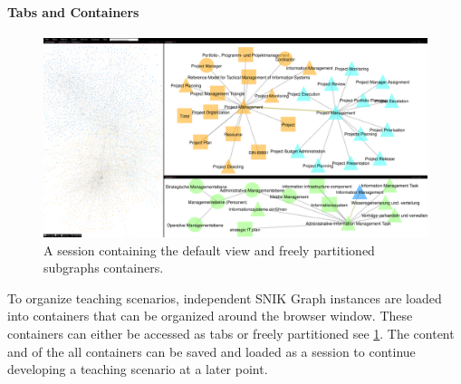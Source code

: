 \documentclass[conference]{IEEEtran}
\begin{document}
\paragraph{Tabs and Containers}
\begin{figure}[h]
    \centering
    \includegraphics[width=\linewidth]{img/tabs.png}
    \caption{A session containing the default view and freely partitioned subgraphs containers.}
	\label{fig:tabs}
\end{figure}
\vspace{-3pt}
To organize teaching scenarios, independent SNIK Graph instances are loaded into containers\footnotemark{} that can be organized around the browser window.
These containers can either be accessed as tabs or freely partitioned see \cref{fig:tabs}.
The content and of the all containers can be saved and loaded as a session to continue developing a teaching scenario at a later point.

\end{document}

